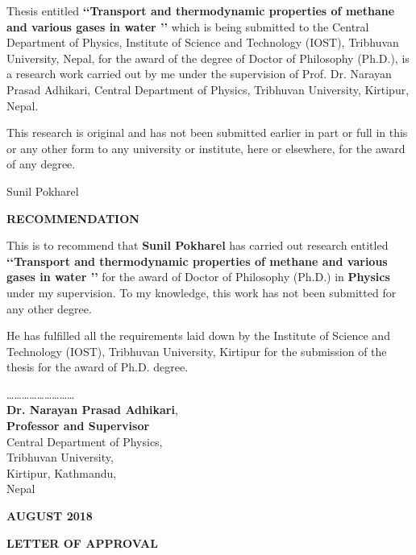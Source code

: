 Thesis entitled {\bf \lq\lq Transport and thermodynamic properties of methane and various gases in water  \rq \rq} which is being submitted to the Central Department of Physics, Institute of Science and Technology (IOST), Tribhuvan University,
Nepal, for the award of the degree of Doctor of Philosophy (Ph.D.), is a research work carried out by me under the supervision of Prof. Dr. Narayan Prasad Adhikari, Central Department of Physics, Tribhuvan University, Kirtipur, Nepal. 

This research is original and has not been submitted earlier in part or full in this or any other form to any university or institute, here or elsewhere, for the award of any degree.

\vskip 4.0cm                                                                                               

\hfill Sunil Pokharel \\
\newpage
{}
{}
\begin{center}
\Large\bf RECOMMENDATION
\end{center}
\vspace*{1.0cm}

This is to recommend that {\bf Sunil Pokharel} has carried out research entitled {\bf \lq \lq Transport and thermodynamic properties of methane  and various gases in water \rq \rq } for the award of Doctor of Philosophy (Ph.D.) in {\bf Physics} under my supervision. To my knowledge, this work has not been submitted for any other degree. 

He has fulfilled all the requirements laid down by the Institute of Science and Technology (IOST), Tribhuvan University, Kirtipur for the submission of the thesis for the award of Ph.D. degree.

\vspace{0.5cm}
\dots\dots\dots\dots\dots\dots\dots\dots\dots \\
\textbf{ Dr. Narayan Prasad Adhikari}, \\
\textbf{Professor and Supervisor} \\
Central Department of Physics,\\
Tribhuvan University,\\
Kirtipur, Kathmandu, \\
Nepal


\vspace{5cm}
\begin{center}
{\bf AUGUST 2018}
\end{center}
\newpage
{}
{}
\centerline{\Large\bf LETTER OF APPROVAL}

